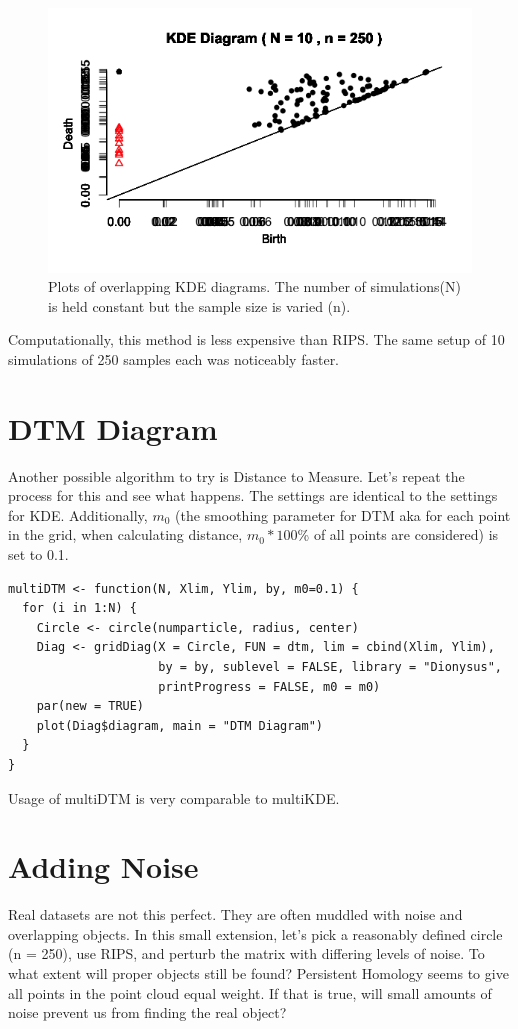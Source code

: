 \documentclass[a4paper]{article}
\begin{document}
\begin{figure}[!htb]
\endminipage\hfill
{}
  \includegraphics[width=\linewidth]{KDE_n250.png}
\endminipage\hfill
\caption{Plots of overlapping KDE diagrams. The number of simulations(N) is held constant but the sample size is varied (n).}
\end{figure}

\noindent Computationally, this method is less expensive than RIPS. The same setup of 10 simulations of 250 samples each was noticeably faster. 

\section{DTM Diagram}
Another possible algorithm to try is Distance to Measure. Let's repeat the process for this and see what happens. The settings are identical to the settings for KDE. Additionally, $m_{0}$ (the smoothing parameter for DTM aka for each point in the grid, when calculating distance, $m_{0}*100$\% of all points are considered) is set to 0.1. 

\begin{lstlisting}
multiDTM <- function(N, Xlim, Ylim, by, m0=0.1) {
  for (i in 1:N) {
    Circle <- circle(numparticle, radius, center)
    Diag <- gridDiag(X = Circle, FUN = dtm, lim = cbind(Xlim, Ylim), 
                     by = by, sublevel = FALSE, library = "Dionysus", 
                     printProgress = FALSE, m0 = m0)
    par(new = TRUE)
    plot(Diag$diagram, main = "DTM Diagram")
  }
}
\end{lstlisting}

\noindent Usage of multiDTM is very comparable to multiKDE. 

\section{Adding Noise}
Real datasets are not this perfect. They are often muddled with noise and overlapping objects. In this small extension, let's pick a reasonably defined circle (n = 250), use RIPS, and perturb the matrix with differing levels of noise. To what extent will proper objects still be found? Persistent Homology seems to give all points in the point cloud equal weight. If that is true, will small amounts of noise prevent us from finding the real object? 
\end{document}
